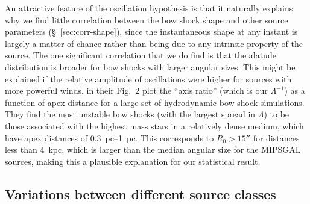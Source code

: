 \documentclass[useAMS, usenatbib, a4paper]{mnras}
\begin{document}
An attractive feature of the oscillation hypothesis is that it
naturally explains why we find little correlation between the bow
shock shape and other source parameters (\S~\ref{sec:corr-shape}),
since the instantaneous shape at any instant is largely a matter of
chance rather than being due to any intrinsic property of the source.
The one significant correlation that we do find is that the alatude
distribution is broader for bow shocks with larger angular sizes.
This might be explained if the relative amplitude of oscillations were
higher for sources with more powerful winds. \citet{Meyer:2016a} in
their Fig.~2 plot the ``axis ratio'' (which is our \(\Lambda^{-1}\)) as a
function of apex distance for a large set of hydrodynamic bow shock
simulations.  They find the most unstable bow shocks (with the largest
spread in \(\Lambda\)) to be those associated with the highest mass stars in
a relatively dense medium, which have apex distances of
\SIrange{0.3}{1}{pc}.  This corresponds to \(R_0 > 15''\) for
distances less than \SI{4}{kpc}, which is larger than the median
angular size for the MIPSGAL sources, making this a plausible explanation for our statistical result.

\subsection{Variations between different source classes}
\label{sec:vari-betw-diff}
\end{document}
